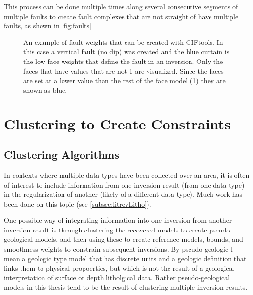 This process can be done multiple times along several consecutive segments of multiple faults to create fault complexes that are not straight of have multiple faults, as shown in \autoref{fig:faults}

\begin{figure} [h]
    \centering
    \caption{An example of fault weights that can be created with GIFtools. In this case a vertical fault (no dip) was created and the blue curtain is the low face weights that define the fault in an inversion. Only the faces that have values that are not 1 are visualized. Since the faces are set at a lower value than the rest of the face model (1) they are shown as blue.}
    \label{fig:faults}
\end{figure}
\FloatBarrier

\section{Clustering to Create Constraints}
\label{sec:cluster}

\subsection{Clustering Algorithms}
\label{subsec:clusterAlgo}

In contexts where multiple data types have been collected over an area, it is often of interest to include information from one inversion result (from one data type) in the regularization of another (likely of a different data type). Much work has been done on this topic (see \autoref{subsec:litrevLitho}). 

One possible way of integrating information into one inversion from another inversion result is through clustering the recovered models to create pseudo-geological models, and then using these to create reference models, bounds, and smoothness weights to constrain subsequent inversions. By pseudo-geologic I mean a geologic type model that has discrete units and a geologic definition that links them to physical propoerties, but which is not the result of a geological interpretation of surface or depth litholgical data. Rather pseudo-geological models in this thesis tend to be the result of clustering multiple inversion results.

